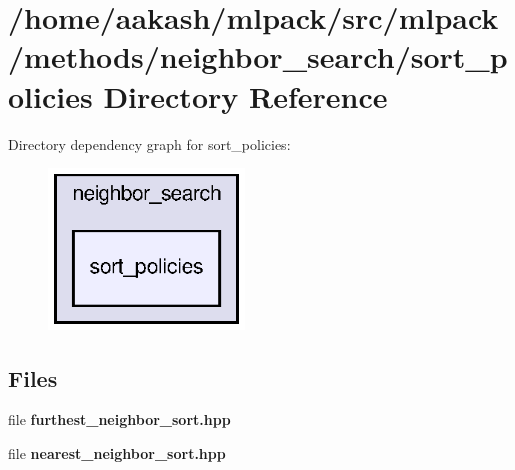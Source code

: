\section{/home/aakash/mlpack/src/mlpack/methods/neighbor\+\_\+search/sort\+\_\+policies Directory Reference}
\label{dir_4b741b852c0cf24d06d11b492e004d31}
Directory dependency graph for sort\+\_\+policies\+:
\nopagebreak
\begin{figure}[H]
\begin{center}
\leavevmode
\includegraphics[width=148pt]{dir_4b741b852c0cf24d06d11b492e004d31_dep}
\end{center}
\end{figure}
\subsection*{Files}
\begin{DoxyCompactItemize}
\item 
file \textbf{ furthest\+\_\+neighbor\+\_\+sort.\+hpp}
\item 
file \textbf{ nearest\+\_\+neighbor\+\_\+sort.\+hpp}
\end{DoxyCompactItemize}
